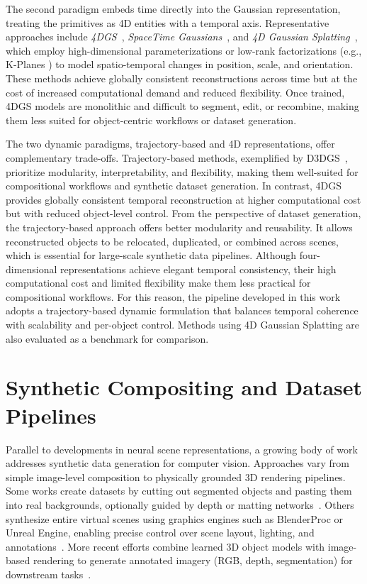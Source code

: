 The second paradigm embeds time directly into the Gaussian representation, treating the primitives as 4D entities with a temporal axis. 
Representative approaches include \textit{4DGS}~\cite{yang2023gs4d}, \textit{SpaceTime Gaussians}~\cite{lispacetimegaussianfeaturesplattingrealtime2024}, and \textit{4D Gaussian Splatting}~\cite{wu20244d}, which employ high-dimensional parameterizations or low-rank factorizations (e.g., K-Planes \cite{fridovich2023k}) to model spatio-temporal changes in position, scale, and orientation. 
These methods achieve globally consistent reconstructions across time but at the cost of increased computational demand and reduced flexibility. 
Once trained, 4DGS models are monolithic and difficult to segment, edit, or recombine, making them less suited for object-centric workflows or dataset generation.


The two dynamic paradigms, trajectory-based and 4D representations, offer complementary trade-offs. Trajectory-based methods, exemplified by D3DGS~\cite{luiten2024dynamic}, prioritize modularity, interpretability, and flexibility, making them well-suited for compositional workflows and synthetic dataset generation. In contrast, 4DGS~\cite{yang2023gs4d} provides globally consistent temporal reconstruction at higher computational cost but with reduced object-level control.  
From the perspective of dataset generation, the trajectory-based approach offers better modularity and reusability. It allows reconstructed objects to be relocated, duplicated, or combined across scenes, which is essential for large-scale synthetic data pipelines. Although four-dimensional representations achieve elegant temporal consistency, their high computational cost and limited flexibility make them less practical for compositional workflows. For this reason, the pipeline developed in this work adopts a trajectory-based dynamic formulation that balances temporal coherence with scalability and per-object control. Methods using 4D Gaussian Splatting are also evaluated as a benchmark for comparison.


\section{Synthetic Compositing and Dataset Pipelines}

Parallel to developments in neural scene representations, a growing body of work addresses synthetic data generation for computer vision. 
Approaches vary from simple image-level composition to physically grounded 3D rendering pipelines. 
Some works create datasets by cutting out segmented objects and pasting them into real backgrounds, optionally guided by depth or matting networks~\cite{Dwibedi2017,Tobin2017,Liu2018,Li2023MattingSurvey}. 
Others synthesize entire virtual scenes using graphics engines such as BlenderProc or Unreal Engine, enabling precise control over scene layout, lighting, and annotations~\cite{Denninger2019,Lee2018}. 
More recent efforts combine learned 3D object models with image-based rendering to generate annotated imagery (RGB, depth, segmentation) for downstream tasks~\cite{Kirillov2023,Bertasius2020,Godard2019,Niu2021}.

